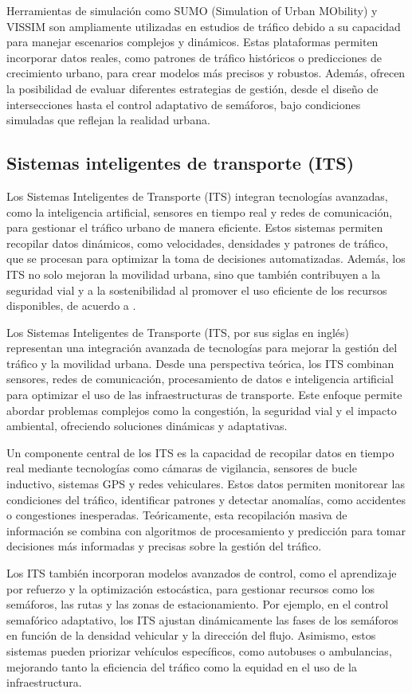 Herramientas de simulación como SUMO (Simulation of Urban MObility) y VISSIM son ampliamente utilizadas en estudios de tráfico debido a su capacidad para manejar escenarios complejos y dinámicos. Estas plataformas permiten incorporar datos reales, como patrones de tráfico históricos o predicciones de crecimiento urbano, para crear modelos más precisos y robustos. Además, ofrecen la posibilidad de evaluar diferentes estrategias de gestión, desde el diseño de intersecciones hasta el control adaptativo de semáforos, bajo condiciones simuladas que reflejan la realidad urbana.

\subsection{Sistemas inteligentes de transporte (ITS)}
Los Sistemas Inteligentes de Transporte (ITS) integran tecnologías avanzadas, como la inteligencia artificial, sensores en tiempo real y redes de comunicación, para gestionar el tráfico urbano de manera eficiente. Estos sistemas permiten recopilar datos dinámicos, como velocidades, densidades y patrones de tráfico, que se procesan para optimizar la toma de decisiones automatizadas. Además, los ITS no solo mejoran la movilidad urbana, sino que también contribuyen a la seguridad vial y a la sostenibilidad al promover el uso eficiente de los recursos disponibles, de acuerdo a \cite{ITS2018}.

Los Sistemas Inteligentes de Transporte (ITS, por sus siglas en inglés) representan una integración avanzada de tecnologías para mejorar la gestión del tráfico y la movilidad urbana. Desde una perspectiva teórica, los ITS combinan sensores, redes de comunicación, procesamiento de datos e inteligencia artificial para optimizar el uso de las infraestructuras de transporte. Este enfoque permite abordar problemas complejos como la congestión, la seguridad vial y el impacto ambiental, ofreciendo soluciones dinámicas y adaptativas.

Un componente central de los ITS es la capacidad de recopilar datos en tiempo real mediante tecnologías como cámaras de vigilancia, sensores de bucle inductivo, sistemas GPS y redes vehiculares. Estos datos permiten monitorear las condiciones del tráfico, identificar patrones y detectar anomalías, como accidentes o congestiones inesperadas. Teóricamente, esta recopilación masiva de información se combina con algoritmos de procesamiento y predicción para tomar decisiones más informadas y precisas sobre la gestión del tráfico.

Los ITS también incorporan modelos avanzados de control, como el aprendizaje por refuerzo y la optimización estocástica, para gestionar recursos como los semáforos, las rutas y las zonas de estacionamiento. Por ejemplo, en el control semafórico adaptativo, los ITS ajustan dinámicamente las fases de los semáforos en función de la densidad vehicular y la dirección del flujo. Asimismo, estos sistemas pueden priorizar vehículos específicos, como autobuses o ambulancias, mejorando tanto la eficiencia del tráfico como la equidad en el uso de la infraestructura.